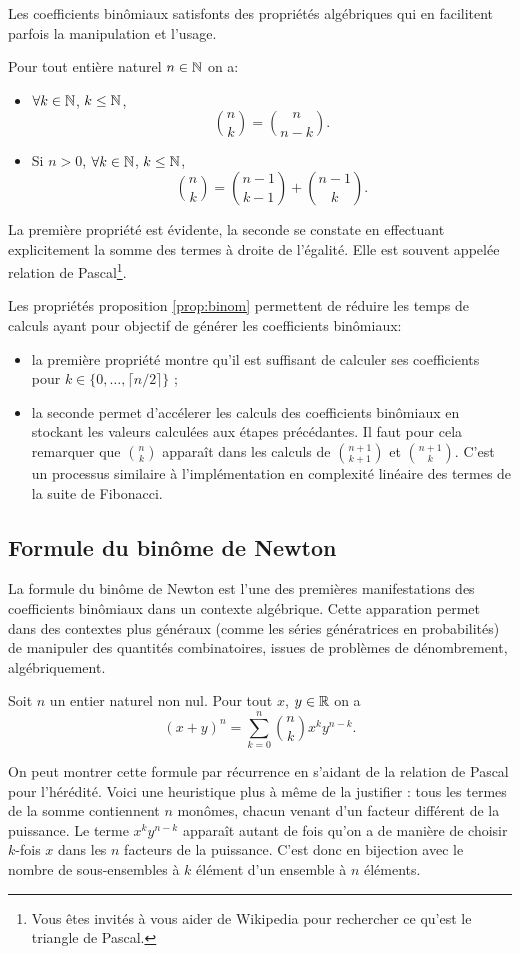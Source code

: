 \documentclass[12pt, a4paper]{article}
\begin{document}
Les coefficients binômiaux satisfonts des propriétés algébriques qui
en facilitent parfois la manipulation et l'usage.
\begin{prop}
  \label{prop:binom}
  Pour tout entière naturel $n \in \mathbb{N}$ on a:
  \begin{itemize}
  \item[\textbullet]
    $\forall k \in \mathbb{N}$, $k \leq \mathbb{N}$,
    \[
      \binom{n}{k} = \binom{n}{n-k}.
    \]
  \item[\textbullet]
    Si $n > 0$, $\forall k \in \mathbb{N}$, $k \leq \mathbb{N}$,
    \[
      \binom{n}{k} = \binom{n-1}{k-1} + \binom{n-1}{k}.
    \]
  \end{itemize}
\end{prop}
\noindent La première propriété est évidente, la seconde se constate
en effectuant explicitement la somme des termes à droite de
l'égalité. Elle est souvent appelée relation de Pascal\footnote{Vous
  êtes invités à vous aider de Wikipedia pour rechercher ce qu'est le
  triangle de Pascal.}.
\begin{rem}
  Les propriétés proposition \ref{prop:binom} permettent de réduire
  les temps de calculs ayant pour objectif de générer les coefficients
  binômiaux:
  \begin{itemize}
  \item la première propriété montre qu'il est suffisant de calculer ses
    coefficients pour $k \in \{0, \ldots, \lceil n / 2 \rceil\}$ ;
  \item la seconde permet d'accélerer les calculs des coefficients
    binômiaux en stockant les valeurs calculées aux étapes
    précédantes. Il faut pour cela remarquer que $\binom{n}{k}$
    apparaît dans les calculs de $\binom{n+1}{k+1}$ et
    $\binom{n+1}{k}$. C'est un processus similaire à l'implémentation
    en complexité linéaire des termes de la suite de Fibonacci.
  \end{itemize}
\end{rem}

\subsection{Formule du binôme de Newton}

La formule du binôme de Newton est l'une des premières manifestations
des coefficients binômiaux dans un contexte algébrique. Cette
apparation permet dans des contextes plus généraux (comme les séries
génératrices en probabilités) de manipuler des quantités
combinatoires, issues de problèmes de dénombrement, algébriquement.
\begin{prop}
  Soit $n$ un entier naturel non nul. Pour tout $x$, $y \in \mathbb{R}$ on a
  \[
    (x + y)^n = \sum_{k=0}^n\binom{n}{k} x^k y^{n-k}.
  \]
\end{prop}
On peut montrer cette formule par récurrence en s'aidant de la
relation de Pascal pour l'hérédité. Voici une heuristique plus à même
de la justifier : tous les termes de la somme contiennent $n$ monômes,
chacun venant d'un facteur différent de la puissance. Le terme
$x^ky^{n-k}$ apparaît autant de fois qu'on a de manière de choisir
$k$-fois $x$ dans les $n$ facteurs de la puissance. C'est donc en
bijection avec le nombre de sous-ensembles à $k$ élément d'un ensemble
à $n$ éléments.
\end{document}

